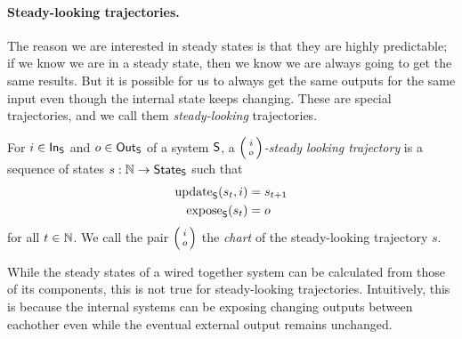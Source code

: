 \documentclass[DynamicalBook]{subfiles}
\begin{document}
\paragraph{Steady-looking trajectories.}

The reason we are interested in steady states is that they are highly
predictable; if we know we are in a steady state, then we know we are always
going to get the same results. But it is possible for us to always get the same
outputs for the same input even though the internal state keeps changing. These
are special trajectories, and we call them \emph{steady-looking} trajectories.

\begin{definition}\label{def.steady_looking_trajectory_discrete}
  For $i \in \mathsf{In}_{\mathsf{S}}$ and $o \in \mathsf{Out}_{\mathsf{S}}$ of a system $\mathsf{S}$, a \emph{$\lens{i}{o}$-steady
    looking trajectory} is a sequence of states $s : \mathbb{N} \to \mathsf{State}_{\mathsf{S}}$ such
  that
  \begin{align*}
    \mathrm{update}_{\mathsf{S}}(s_t, i) &= s_{t + 1} \\
    \mathrm{expose}_{\mathsf{S}}(s_t) &= o
  \end{align*}
  for all $t \in \mathbb{N}$. We call the pair $\lens{i}{o}$ the \emph{chart} of the
  steady-looking trajectory $s$.
\end{definition}

While the steady states of a wired together system can be calculated from those
of its components, this is not true for steady-looking trajectories.
Intuitively, this is because the internal systems can be exposing changing
outputs between eachother even while the eventual external output remains
unchanged.
\end{document}
